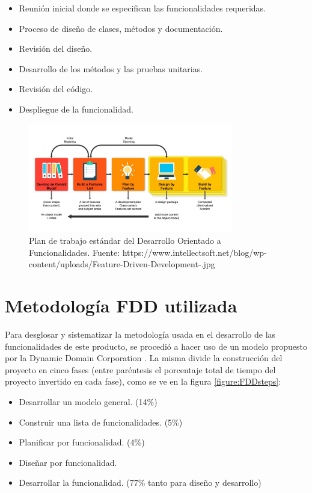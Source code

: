 \begin{itemize}
    \item Reunión inicial donde se especifican las funcionalidades requeridas.
    \item Proceso de diseño de clases, métodos y documentación.
    \item Revisión del diseño.
    \item Desarrollo de los métodos y las pruebas unitarias.
    \item Revisión del código.
    \item Despliegue de la funcionalidad.
\end{itemize}


\begin{figure}[H]
\centering
\includegraphics[width=0.80\textwidth]{img/5.png}
\caption{Plan de trabajo estándar del Desarrollo Orientado a Funcionalidades. Fuente: https://www.intellectsoft.net/blog/wp-content/uploads/Feature-Driven-Development-.jpg }
\label{figure:FDDworkflow}
\end{figure}


\section{Metodología FDD utilizada}

Para desglosar y sistematizar la metodología usada en el desarrollo de las funcionalidades de este producto, se procedió a hacer uso de un modelo propuesto por la Dynamic Domain Corporation \cite{fdd}. La misma divide la construcción del proyecto en cinco fases (entre paréntesis el porcentaje total de tiempo del proyecto invertido en cada fase), como se ve en la figura \ref{figure:FDDsteps}:

\begin{itemize}
    \item Desarrollar un modelo general. (14\%)
    \item Construir una lista de funcionalidades. (5\%)
    \item Planificar por funcionalidad. (4\%)
    \item Diseñar por funcionalidad.
    \item Desarrollar la funcionalidad. (77\%  tanto para diseño y desarrollo)

\end{itemize}

